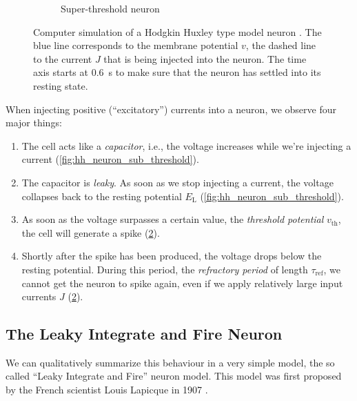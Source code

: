 \documentclass[10pt,letterpaper,oneside]{article}
\begin{document}
\begin{figure}
\begin{subfigure}{0.5\textwidth}
		\caption{Super-threshold neuron}%
		\label{fig:hh_neuron_super_threshold}
	\end{subfigure}%
	\caption{Computer simulation of a Hodgkin Huxley type model neuron \cite{hodgkin1952quantitative,traub1991neuronal}. The blue line corresponds to the membrane potential $v$, the dashed line to the current $J$ that is being injected into the neuron. The time axis starts at \SI{0.6}{\second} to make sure that the neuron has settled into its resting state.}
\end{figure}

When injecting positive (\enquote{excitatory}) currents into a neuron, we observe four major things:
\begin{enumerate}
	\item The cell acts like a \emph{capacitor}, i.e., the voltage increases while we're injecting a current (\cref{fig:hh_neuron_sub_threshold}).
	\item The capacitor is \emph{leaky}. As soon as we stop injecting a current, the voltage collapses back to the resting potential $E_\mathrm{L}$ (\cref{fig:hh_neuron_sub_threshold}).
	\item As soon as the voltage surpasses a certain value, the \emph{threshold potential} $v_\mathrm{th}$, the cell will generate a spike (\cref{fig:hh_neuron_super_threshold}).
	\item Shortly after the spike has been produced, the voltage drops below the resting potential. During this period, the \emph{refractory period} of length $\tau_\mathrm{ref}$, we cannot get the neuron to spike again, even if we apply relatively large input currents $J$ (\cref{fig:hh_neuron_super_threshold}).
\end{enumerate}

\newpage


\subsection{The Leaky Integrate and Fire Neuron}

We can qualitatively summarize this behaviour in a very simple model, the so called \enquote{Leaky Integrate and Fire} neuron model. This model was first proposed by the French scientist Louis Lapicque in 1907 \cite{lapicque1907recherches,abbott1999lapicque}.
\end{document}
